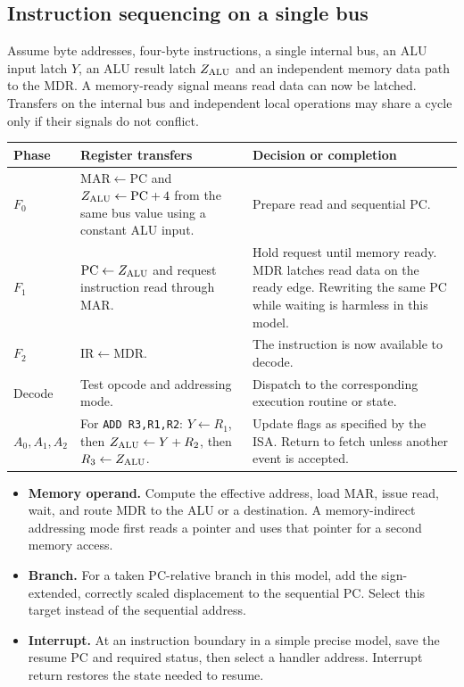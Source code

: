 \documentclass[12pt,a4paper]{article}
\begin{document}
\subsection{Instruction sequencing on a single bus}
Assume byte addresses, four-byte instructions, a single internal bus, an ALU input latch $Y$, an ALU result latch $Z_{\rm ALU}$ and an independent memory data path to the MDR. A memory-ready signal means read data can now be latched. Transfers on the internal bus and independent local operations may share a cycle only if their signals do not conflict.
\par\vspace{6pt}\noindent
\begin{tabularx}{\linewidth}{|B{2.5cm}|Y|Y|}\hline
Phase & Register transfers & Decision or completion \\ \hline
$F_0$ & $\mathrm{MAR}\leftarrow\mathrm{PC}$ and $Z_{\rm ALU}\leftarrow\mathrm{PC}+4$ from the same bus value using a constant ALU input. & Prepare read and sequential PC. \\ \hline
$F_1$ & $\mathrm{PC}\leftarrow Z_{\rm ALU}$ and request instruction read through MAR. & Hold request until memory ready. MDR latches read data on the ready edge. Rewriting the same PC while waiting is harmless in this model. \\ \hline
$F_2$ & $\mathrm{IR}\leftarrow\mathrm{MDR}$. & The instruction is now available to decode. \\ \hline
Decode & Test opcode and addressing mode. & Dispatch to the corresponding execution routine or state. \\ \hline
$A_0,A_1,A_2$ & For \texttt{ADD R3,R1,R2}: $Y\leftarrow R_1$, then $Z_{\rm ALU}\leftarrow Y+R_2$, then $R_3\leftarrow Z_{\rm ALU}$. & Update flags as specified by the ISA. Return to fetch unless another event is accepted. \\ \hline
\end{tabularx}

\begin{itemize}[leftmargin=*,itemsep=3pt]
\item \textbf{Memory operand.} Compute the effective address, load MAR, issue read, wait, and route MDR to the ALU or a destination. A memory-indirect addressing mode first reads a pointer and uses that pointer for a second memory access.
\item \textbf{Branch.} For a taken PC-relative branch in this model, add the sign-extended, correctly scaled displacement to the sequential PC. Select this target instead of the sequential address.
\item \textbf{Interrupt.} At an instruction boundary in a simple precise model, save the resume PC and required status, then select a handler address. Interrupt return restores the state needed to resume.
\end{itemize}
\end{document}
